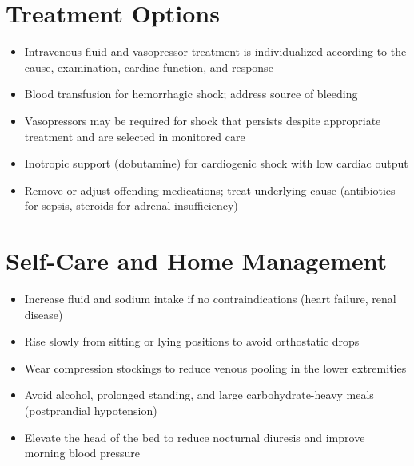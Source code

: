 \section*{Treatment Options}
\begin{itemize}
  \item Intravenous fluid and vasopressor treatment is individualized according to the cause, examination, cardiac function, and response
  \item Blood transfusion for hemorrhagic shock; address source of bleeding
  \item Vasopressors may be required for shock that persists despite appropriate treatment and are selected in monitored care
  \item Inotropic support (dobutamine) for cardiogenic shock with low cardiac output
  \item Remove or adjust offending medications; treat underlying cause (antibiotics for sepsis, steroids for adrenal insufficiency)
\end{itemize}

\section*{Self-Care and Home Management}
\begin{itemize}
  \item Increase fluid and sodium intake if no contraindications (heart failure, renal disease)
  \item Rise slowly from sitting or lying positions to avoid orthostatic drops
  \item Wear compression stockings to reduce venous pooling in the lower extremities
  \item Avoid alcohol, prolonged standing, and large carbohydrate-heavy meals (postprandial hypotension)
  \item Elevate the head of the bed to reduce nocturnal diuresis and improve morning blood pressure
\end{itemize}

